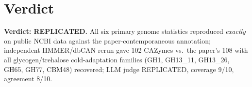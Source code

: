 \documentclass[11pt]{article}
\begin{document}
\section{Verdict}
\textbf{Verdict: REPLICATED.} All six primary genome statistics reproduced \emph{exactly} on public NCBI data against the paper-contemporaneous annotation; independent HMMER/dbCAN rerun gave 102 CAZymes vs.\ the paper's 108 with all glycogen/trehalose cold-adaptation families (GH1, GH13\_11, GH13\_26, GH65, GH77, CBM48) recovered; LLM judge REPLICATED, coverage 9/10, agreement 8/10.
\end{document}
